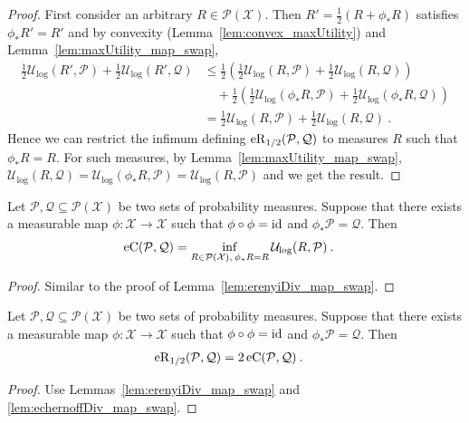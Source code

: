 \begin{proof}\leanok
First consider an arbitrary $R \in \mathcal{P}(\mathcal{X})$.
Then $R' = \frac{1}{2}(R + \phi_* R)$ satisfies $\phi_* R' = R'$ and by convexity (Lemma~\ref{lem:convex_maxUtility}) and Lemma~\ref{lem:maxUtility_map_swap},
\begin{align*}
  \frac{1}{2} \mathcal{U}_{\log}(R', \mathcal{P}) + \frac{1}{2} \mathcal{U}_{\log}(R', \mathcal{Q})
  &\le \frac{1}{2} \left( \frac{1}{2} \mathcal{U}_{\log}(R, \mathcal{P}) + \frac{1}{2} \mathcal{U}_{\log}(R, \mathcal{Q}) \right)
  \\
  &\quad + \frac{1}{2} \left( \frac{1}{2} \mathcal{U}_{\log}(\phi_* R, \mathcal{P}) + \frac{1}{2} \mathcal{U}_{\log}(\phi_* R, \mathcal{Q}) \right)
  \\
  &= \frac{1}{2} \mathcal{U}_{\log}(R, \mathcal{P}) + \frac{1}{2} \mathcal{U}_{\log}(R, \mathcal{Q})
  \: .
\end{align*}
Hence we can restrict the infimum defining $\operatorname{eR}_{1/2}(\mathcal{P}, \mathcal{Q})$ to measures $R$ such that $\phi_* R = R$.
For such measures, by Lemma~\ref{lem:maxUtility_map_swap}, $\mathcal{U}_{\log}(R, \mathcal{Q}) = \mathcal{U}_{\log}(\phi_* R, \mathcal{P}) = \mathcal{U}_{\log}(R, \mathcal{P})$ and we get the result.
\end{proof}


\begin{lemma}\label{lem:echernoffDiv_map_swap}
  \leanok
Let $\mathcal{P},\mathcal{Q} \subseteq \mathcal{P}(\mathcal{X})$ be two sets of probability measures.
Suppose that there exists a measurable map $\phi : \mathcal{X} \to \mathcal{X}$ such that $\phi \circ \phi = \operatorname{id}$ and $\phi_* \mathcal{P} = \mathcal{Q}$.
Then
\begin{align*}
  \operatorname{eC}(\mathcal{P}, \mathcal{Q})
  &= \inf_{R \in \mathcal{P}(\mathcal{X}), \: \phi_* R = R} \mathcal{U}_{\log}(R, \mathcal{P})
  \: .
\end{align*}
\end{lemma}

\begin{proof}\leanok
Similar to the proof of Lemma~\ref{lem:erenyiDiv_map_swap}.
\end{proof}


\begin{lemma}\label{lem:erenyiDiv_eq_two_mul_echernoffDiv}
  \leanok
Let $\mathcal{P},\mathcal{Q} \subseteq \mathcal{P}(\mathcal{X})$ be two sets of probability measures.
Suppose that there exists a measurable map $\phi : \mathcal{X} \to \mathcal{X}$ such that $\phi \circ \phi = \operatorname{id}$ and $\phi_* \mathcal{P} = \mathcal{Q}$.
Then
\begin{align*}
  \operatorname{eR}_{1/2}(\mathcal{P}, \mathcal{Q})
  &= 2 \operatorname{eC}(\mathcal{P}, \mathcal{Q})
  \: .
\end{align*}
\end{lemma}

\begin{proof}\leanok
Use Lemmas~\ref{lem:erenyiDiv_map_swap} and \ref{lem:echernoffDiv_map_swap}.
\end{proof}
